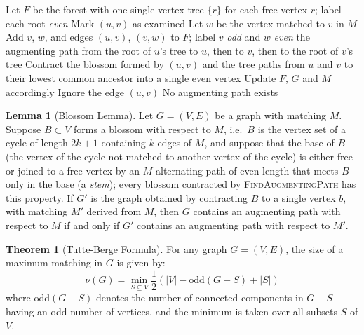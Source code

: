 \documentclass{article}
\theoremstyle{definition}
\newtheorem{theorem}{Theorem}
\newtheorem{lemma}{Lemma}
\begin{document}
\begin{algorithm}
\caption{Find Augmenting Path}
\begin{algorithmic}[1]
    \State Let $F$ be the forest with one single-vertex tree $\{r\}$ for each free vertex $r$; label each root \emph{even}
        \State Mark $(u, v)$ as examined
         
            \State Let $w$ be the vertex matched to $v$ in $M$
            \State Add $v$, $w$, and edges $(u, v)$, $(v, w)$ to $F$; label $v$ \emph{odd} and $w$ \emph{even}
            \State \Return the augmenting path from the root of $u$'s tree to $u$, then to $v$, then to the root of $v$'s tree
            \State Contract the blossom formed by $(u, v)$ and the tree paths from $u$ and $v$ to their lowest common ancestor into a single even vertex
            \State Update $F$, $G$ and $M$ accordingly 
        \Else {}
            \State Ignore the edge $(u, v)$
        \EndIf
    \EndWhile
    \State \Return No augmenting path exists
\EndProcedure
\end{algorithmic}
\end{algorithm}


\begin{lemma}[Blossom Lemma]
Let $G = (V, E)$ be a graph with matching $M$. Suppose $B \subset V$ forms a blossom with respect to $M$, i.e.\ $B$ is the vertex set of a cycle of length $2k+1$ containing $k$ edges of $M$, and suppose that the base of $B$ (the vertex of the cycle not matched to another vertex of the cycle) is either free or joined to a free vertex by an $M$-alternating path of even length that meets $B$ only in the base (a \emph{stem}); every blossom contracted by \textsc{FindAugmentingPath} has this property. If $G'$ is the graph obtained by contracting $B$ to a single vertex $b$, with matching $M'$ derived from $M$, then $G$ contains an augmenting path with respect to $M$ if and only if $G'$ contains an augmenting path with respect to $M'$.
\end{lemma}

\begin{theorem}[Tutte-Berge Formula]
For any graph $G = (V, E)$, the size of a maximum matching in $G$ is given by:
\[
\nu(G) = \min_{S \subseteq V} \frac{1}{2}(|V| - \text{odd}(G - S) + |S|)
\]
where $\text{odd}(G - S)$ denotes the number of connected components in $G - S$ having an odd number of vertices, and the minimum is taken over all subsets $S$ of $V$.
\end{theorem}
\end{document}
